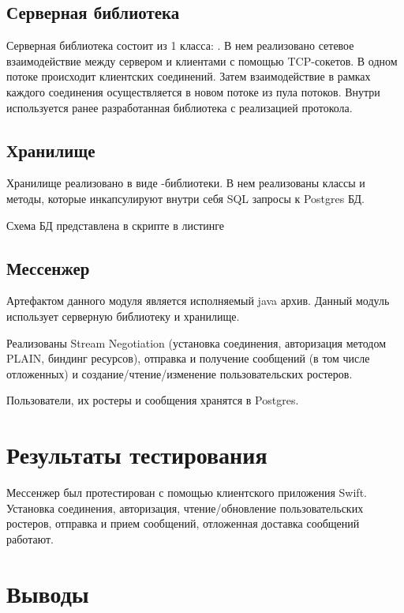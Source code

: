 \subsection{Серверная библиотека}

Серверная библиотека состоит из 1 класса: . В нем реализовано сетевое взаимодействие между сервером и клиентами с помощью TCP-сокетов. В одном потоке происходит  клиентских соединений. Затем взаимодействие в рамках каждого соединения осуществляется в новом потоке из пула потоков. Внутри используется ранее разработанная библиотека с реализацией протокола.

\subsection{Хранилище}

Хранилище реализовано в виде -библиотеки. В нем реализованы классы и методы, которые инкапсулируют внутри себя SQL запросы к Postgres БД.

Схема БД представлена в скрипте в листинге



\subsection{Мессенжер}

Артефактом данного модуля является исполняемый java архив. Данный модуль использует серверную библиотеку и хранилище. 

Реализованы Stream Negotiation (установка соединения, авторизация методом PLAIN, биндинг ресурсов), отправка и получение сообщений (в том числе отложенных) и создание/чтение/изменение пользовательских ростеров.

Пользователи, их ростеры и сообщения хранятся в Postgres.

\section{Результаты тестирования}

Мессенжер был протестирован с помощью клиентского приложения Swift. Установка соединения, авторизация, чтение/обновление пользовательских ростеров, отправка и прием сообщений, отложенная доставка сообщений работают.

\section{Выводы}

